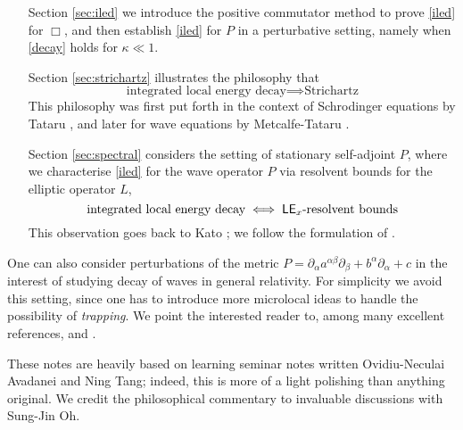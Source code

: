 \begin{itemize}[leftmargin=6em]
	\item[\hspace{4em}Section \ref{sec:iled}]  we introduce the positive commutator method to prove \eqref{iled} for $\Box$, and then establish \eqref{iled} for $P$ in a perturbative setting, namely when \eqref{decay} holds for $\kappa \ll 1$. 
	
	\item[Section \ref{sec:strichartz}] illustrates the philosophy that 
		\[
			\text{integrated local energy decay} \implies \text{Strichartz}
		\]
		This philosophy was first put forth in the context of Schrodinger equations by Tataru \cite{Tataru2008}, and later for wave equations by Metcalfe-Tataru \cite{MetcalfeTataru2012}. 
		
	\item[Section \ref{sec:spectral}] considers the setting of stationary self-adjoint $P$, where we characterise \eqref{iled} for the wave operator $P$ via resolvent bounds for the elliptic operator $L$,
		\[
			\text{integrated local energy decay} \iff \text{$\mathsf{LE}_x$-resolvent bounds}
		\]
		This observation goes back to Kato \cite{Kato1965}; we follow the formulation of \cite{Tataru2013}. 
	
\end{itemize}
	
\begin{remark}
	One can also consider perturbations of the metric $P = \partial_\alpha a^{\alpha \beta} \partial_\beta + b^\alpha \partial_\alpha + c$ in the interest of studying decay of waves in general relativity. For simplicity we avoid this setting, since one has to introduce more microlocal ideas to handle the possibility of \textit{trapping}. We point the interested reader to, among many excellent references, \cite{MetcalfeTataru2012} and \cite{MetcalfeEtAl2020a}.
\end{remark}	
	
\begin{acknowledgments}
	These notes are heavily based on learning seminar notes written Ovidiu-Neculai Avadanei and Ning Tang; indeed, this is more of a light polishing than anything original. We credit the philosophical commentary to invaluable discussions with Sung-Jin Oh.  
\end{acknowledgments}


